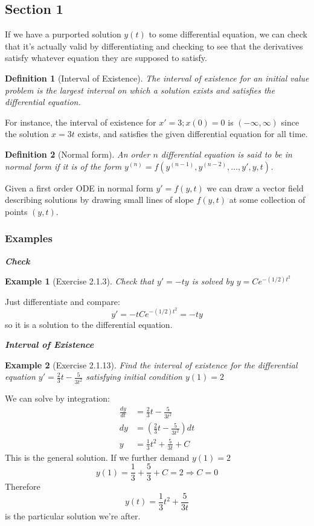\documentclass[14pt]{article}
\newtheorem{defn}{Definition}
\newtheorem{ex}{Example}
\newcommand{\type}[1]{\begin{center} \emph{\textbf{#1}} \end{center}}
\newcommand{\exs}{\subsubsection*{Examples}}
\begin{document}
\subsection{Section 1}

If we have a purported solution $y(t)$ to some differential equation, we can check that it's
actually valid by differentiating and checking to see that the derivatives satisfy whatever equation
they are supposed to satisfy.

\begin{defn}[Interval of Existence]
  The \emph{interval of existence} for an initial value problem is the largest interval on which a
  solution exists and satisfies the differential equation.
\end{defn}

For instance, the interval of existence for $x' =3; x(0)=0$ is $(-\infty, \infty)$ since the
solution $x = 3t$ exists, and satisfies the given differential equation for all time.


\begin{defn}[Normal form]
  An order $n$ differential equation is said to be in \emph{normal form} if it is of the form $y^{(n)} = f(y^{(n-1)}, y^{(n-2)}, \dots, y',y,t)$.
\end{defn}

Given a first order ODE in normal form $y' = f(y,t)$ we can draw a vector field describing solutions
by drawing small lines of slope $f(y,t)$ at some collection of points $(y,t)$.

\exs

\type{Check}
\begin{ex}[Exercise 2.1.3] Check that $y' = -ty$ is solved by $y = C e ^{-(1/2) t^2}$\end{ex}

Just differentiate and compare:
\[y' = -t C e^{-(1/2) t^2} = -t y\]
so it is a solution to the differential equation.

\type{Interval of Existence}
\begin{ex}[Exercise 2.1.13] Find the interval of existence for the differential equation $y' =
  \frac{2}{3} t - \frac{5}{3 t^2}  $ satisfying initial condition $y(1) = 2$ \end{ex}

We can solve by integration:
\begin{align*}
\frac{dy}{dt}  &= \frac{2}{3} t - \frac{5}{3 t^2}\\
dy &= \left( \frac{2}{3} t - \frac{5}{3 t^2} \right) dt\\
y &= \frac{1}{3} t^2 + \frac{5}{3t} + C
\end{align*}
This is the general solution. If we further demand $y(1) = 2$
\[y(1) = \frac{1}{3} + \frac{5}{3} + C = 2 \Rightarrow C = 0\]
Therefore
\[y(t) = \frac{1}{3} t^2 + \frac{5}{3 t} \]
is the particular solution we're after.
\end{document}
